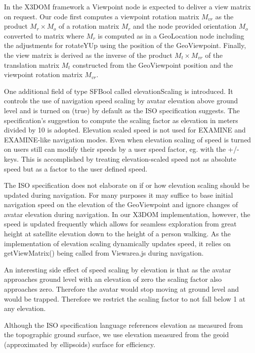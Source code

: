 \documentclass[review]{acmsiggraph}            %
\begin{document}
In the X3DOM framework a Viewpoint node is expected to deliver a view matrix on request. Our code
first computes a viewpoint rotation matrix $M_{vr}$ as the product $M_r \times M_o$ of a rotation
matrix $M_r$ and the node provided orientation $M_o$ converted to matrix where $M_r$ is computed as
in a GeoLocation node including the adjustments for rotateYUp using the position of the
GeoViewpoint. Finally, the view matrix is derived as the inverse of the product $M_t \times M_{vr}$
of the translation matrix $M_t$ constructed from the GeoViewpoint position and the viewpoint
rotation matrix $M_{vr}$.

One additional field of type SFBool called elevationScaling is introduced. It controls the use of
navigation speed scaling by avatar elevation above ground level and is turned on (true) by default
as the ISO specification suggests. The specification's suggestion to compute the scaling factor as
elevation in meters divided by 10 is adopted. Elevation scaled speed is not used for EXAMINE and
EXAMINE-like navigation modes. Even when elevation scaling of speed is turned on users still can
modify their speeds by a user speed factor, eg. with the +/- keys. This is accomplished by treating
elevation-scaled speed not as absolute speed but as a factor to the user defined speed. 

The ISO specification does not elaborate on if or how elevation scaling should be updated during
navigation. For many purposes it may suffice to base initial navigation speed on the elevation of
the GeoViewpoint and ignore changes of avatar elevation during navigation. In our X3DOM
implementation, however, the speed is updated frequently which allows for seamless exploration from
great height at satellite elevation down to the height of a person walking. As the implementation of
elevation scaling dynamically updates speed, it relies on getViewMatrix() being called from
Viewarea.js during navigation.

An interesting side effect of speed scaling by elevation is that as the avatar approaches ground
level with an elevation of zero the scaling factor also approaches zero. Therefore the avatar would
stop moving at ground level and would be trapped. Therefore we restrict  the scaling factor to not
fall below 1 at any elevation.

Although the ISO specification language references elevation as measured from the topographic ground
surface, we use elevation measured from the geoid (approximated by ellipsoids) surface for
efficiency.
\end{document}
